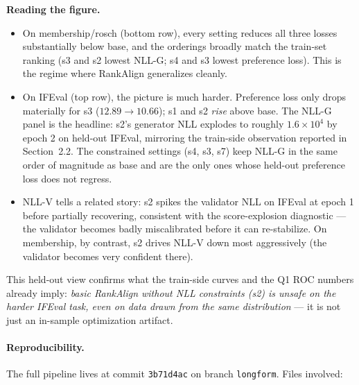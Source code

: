 \documentclass[11pt,a4paper]{article}
\begin{document}
\textbf{Reading the figure.}
\begin{itemize}
\item On membership/rosch (bottom row), every setting reduces all three losses substantially below base, and the orderings broadly match the train-set ranking (s3 and s2 lowest NLL-G; s4 and s3 lowest preference loss). This is the regime where RankAlign generalizes cleanly.
\item On IFEval (top row), the picture is much harder. Preference loss only drops materially for s3 ($12.89 \to 10.66$); s1 and s2 \emph{rise} above base. The NLL-G panel is the headline: s2's generator NLL explodes to roughly $1.6\times10^4$ by epoch 2 on held-out IFEval, mirroring the train-side observation reported in Section~2.2. The constrained settings (s4, s3, s7) keep NLL-G in the same order of magnitude as base and are the only ones whose held-out preference loss does not regress.
\item NLL-V tells a related story: s2 spikes the validator NLL on IFEval at epoch 1 before partially recovering, consistent with the score-explosion diagnostic --- the validator becomes badly miscalibrated before it can re-stabilize. On membership, by contrast, s2 drives NLL-V down most aggressively (the validator becomes very confident there).
\end{itemize}

This held-out view confirms what the train-side curves and the Q1 ROC numbers already imply: \emph{basic RankAlign without NLL constraints (s2) is unsafe on the harder IFEval task, even on data drawn from the same distribution} --- it is not just an in-sample optimization artifact.

\paragraph{Reproducibility.} The full pipeline lives at commit \texttt{3b71d4ac} on branch \texttt{longform}. Files involved:
\end{document}
